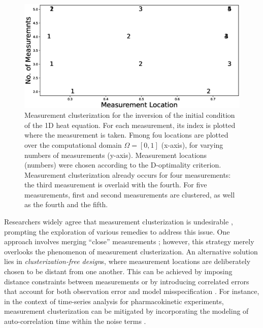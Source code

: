 \begin{figure}[H]
    \centering
    \includegraphics[height=0.5\textwidth]{example.eps}
    \caption{Measurement clusterization for the inversion of the
      initial condition of the 1D heat equation. For each measurement,
      its index is plotted where the measurement is taken. Fmong fou
      locations are plotted over the computational domain $\Omega =
      [0, 1]$ (x-axis), for varying numbers of measurements
      (y-axis). Measurement locations (numbers) were chosen according
      to the D-optimality criterion. Measurement clusterization
      already occurs for four measurements: the third measurement is
      overlaid with the fourth. For five measurements, first and
      second measurements are clustered, as well as the fourth and the
      fifth.}
  \label{fig:clusterization illustration}
\end{figure}


Researchers widely agree that measurement clusterization is
undesirable \cite{fedorov1996, hooker2009, fedorov2012, Ucinski05,
  neitzel2019sparse}, prompting the exploration of various remedies to
address this issue. One approach involves merging ``close''
measurements \cite{fedorov2012}; however, this strategy merely
overlooks the phenomenon of measurement clusterization. An alternative
solution lies in \emph{clusterization-free design}s, where measurement
locations are deliberately chosen to be distant from one another. This
can be achieved by imposing distance constraints between measurements
or by introducing correlated errors that account for both observation
error and model misspecification \cite{Ucinski05}. For instance, in
the context of time-series analysis for pharmacokinetic experiments,
measurement clusterization can be mitigated by incorporating the
modeling of auto-correlation time within the noise terms
\cite{hooker2009}.


